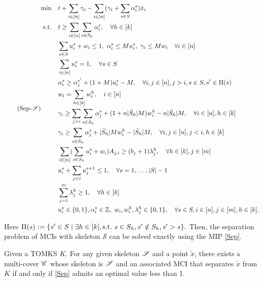 \begin{appendices}
\begin{align}
\label{Sep}
\tag{Sep-$\S$}
\begin{split}
\min \quad & t + \sum_{i \in [n]} \gamma_i - \sum_{i \in [n]} (\gamma_i + \sum_{s \in S} \alpha^s_i) \tilde x_i \\
\st \quad & t \geq \sum_{i \in [n]} \sum_{s \in S_h} \alpha^s_i, \quad \forall h \in [k]\\
& \sum_{s \in S} u^s_i + w_i \leq 1, \ \alpha^s_i \leq M u^s_i, \ \gamma_i \leq M w_i \quad \forall i \in [n] \\
& \sum_{i \in [n]} u^s_i = 1, \quad \forall s \in S \\
& \alpha^s_i \geq \alpha^{s'}_j + (1+M) u^s_i -M, \quad \forall i,j \in [n], j > i, s \in S, s' \in \Pi(s) \\
& w_i = \sum_{h \in [k]} w^h_i, \quad i \in [n] \\
& \gamma_i \geq \sum_{j>i} \sum_{s \in \bar S_h} \alpha^s_j + (1+n |\bar S_h| M)w^h_i - n|\bar S_h| M, \quad \forall i \in [n], h \in [k] \\
& \gamma_i \geq \sum_{s \in \bar S_h} \alpha^s_j + |\bar S_h| M w^h_i -  |\bar S_h| M, \quad \forall i,j \in [n], j < i, h \in [k] \\
& \sum_{i \in [n]} (\sum_{s \in S_h} u^s_i + w_i) A_{j,i} \geq (b_j+1) \lambda^h_j, \quad \forall h \in [k], j \in [m] \\
& u^s_i + \sum_{j<i} u^{s+1}_j \leq 1, \quad \forall s = 1, \ldots, |S| - 1 \\
& \sum_{j=1}^m \lambda^h_j \geq 1, \quad \forall h \in [k] \\
& u^s_i \in \{0,1\}, \alpha^s_i \in \Z,\ w_i, w^h_i, \lambda^h_j \in \{0,1\}, \quad \forall s \in S, i \in [n], j \in [m], h \in [k].
\end{split}
\end{align}

Here $\Pi(s): = \{s' \in S \mid \exists h \in [k], \st \ s \in S_h, s' \notin S_h, s' > s\}.$ 
Then, the separation problem of MCIs with skeleton $\mathscr{S}$ can be solved exactly using the MIP \eqref{Sep}.

\begin{theorem}
\label{theo: general_skeleton_sep}
Given a TOMKS $K$. For any given skeleton $\S$ and a point $\tilde x$,
there exists a multi-cover $\C$ whose skeleton is $\S$ and an associated MCI that separates $\tilde x$ from $K$ if and only if \eqref{Sep} admits an optimal value less than 1.
\end{theorem}


\end{appendices}
